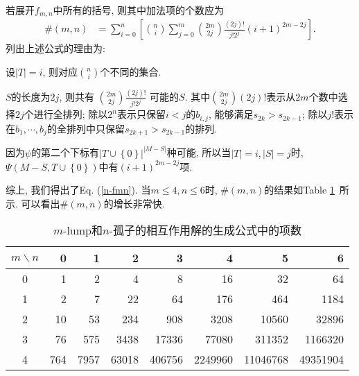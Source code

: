 \documentclass[12pt,a4paper,UTF8]{article}
\numberwithin{equation}{section}
\newcommand{\mbrace}[1]{\left[#1\right]}
\newcommand{\bbrace}[1]{\left\{#1\right\}}
\newcommand{\refeqn}[1]{Eq. (\ref{#1})}
\newcommand{\reftab}[1]{Table \ref{#1}~}
\newcommand{\MLNS}{$m$-lump和$n$-孤子的相互作用解}
\begin{document}
若展开$f_{m,n}$中所有的括号, 则其中加法项的个数应为
\begin{equation}
\begin{aligned}
\#(m,n)&=\sum_{i=0}^n\mbrace{\binom{n}{i}\sum_{j=0}^m{\binom{2m}{2j}\frac{(2j)!}{j!2^j}(i+1)^{2m-2j}}}. 
\end{aligned}
\label{n-fmn}
\end{equation}
列出上述公式的理由为:
\begin{compactitem}[\textbullet]
\item 设$|T|=i$, 则对应$\binom{n}{i}$个不同的集合.
\item $S$的长度为$2j$, 则共有 $\binom{2m}{2j}\frac{(2j)!}{j!2^j}$ 可能的$S$. 其中$\binom{2m}{2j}(2j)!$表示从$2m$个数中选择$2j$个进行全排列; 除以$2^n$表示只保留$i<j$的$b_{i,j}$, 能够满足$s_{2k}>s_{2k-1}$; 除以$j!$表示在$b_1,\cdots,b_j$的全排列中只保留$s_{2k+1}>s_{2k-1}$的排列. 
\item 因为$\psi$的第二个下标有$|T\cup \bbrace{0}|^{|M-S|}$种可能, 所以当$|T|=i,|S|=j$时, $\Psi(M-S,T\cup\bbrace{0})$中有$(i+1)^{2m-2j}$项.
\end{compactitem}
综上, 我们得出了\refeqn{n-fmn}. 当$m\le 4, n\le 6$时, $\#(m,n)$的结果如\reftab{tb-n-fmn}所示. 可以看出$\#(m,n)$的增长非常快.

\begin{table}[htbp]
\centering 
\caption{\MLNS{}的生成公式中的项数} \label{tb-n-fmn}
\begin{tabular}{c|*{7}{r}}
\hline 
$m\backslash n$ & 0 & 1 & 2 & 3 & 4 & 5 & 6\\
\hline 
0 & 1 & 2 & 4 & 8 & 16 & 32 & 64 \\
1 & 2 & 7 & 22 & 64 & 176 & 464 & 1184 \\
2 & 10 & 53 & 234 & 908 & 3208 & 10560 & 32896 \\
3 & 76 & 575 & 3438 & 17336 & 77080 & 311352 & 1166320 \\
4 & 764 & 7957 & 63018 & 406756 & 2249960 & 11046768 & 49351904 \\
\hline 
\end{tabular}
\end{table}
\end{document}
